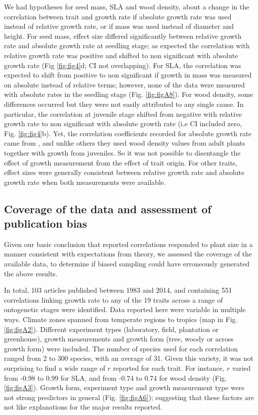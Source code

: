 \documentclass[a4paper,11pt]{article}
\begin{document}
We had hypotheses for seed mass, SLA and wood density, about a change in the correlation between trait and growth rate if absolute growth rate was used instead of relative growth rate, or if mass was used instead of diameter and height. For seed mass, effect size differed significantly between relative growth rate and absolute growth rate at seedling stage; as expected the correlation with relative growth rate was positive and shifted to non significant with absolute growth rate (Fig \ref{fig:fig4}d; CI not overlapping). For SLA, the correlation was expected to shift from positive to non significant if growth in mass was measured on absolute instead of relative terms; however, none of the data were measured with absolute rates in the seedling stage (Fig. \ref{fig:figA8}). For wood density, some differences occurred but they were not easily attributed to any single cause. In particular, the correlation at juvenile stage shifted from negative with relative growth rate to non significant with absolute growth rate (i.e CI included zero, Fig. \ref{fig:fig4}b). Yet, the correlation coefficients recorded for absolute growth rate came from \citet{Augspurger:1984ct}, and unlike others they used wood density values from adult plants together with growth from juveniles. So it was not possible to disentangle the effect of growth measurement from the effect of trait origin. For other traits, effect sizes were generally consistent between relative growth rate and absolute growth rate when both measurements were available.


\subsection*{Coverage of the data and assessment of publication bias}

Given our basic conclusion that reported correlations responded to plant size in a manner consistent with expectations from theory, we assessed the coverage of the available data, to determine if biased sampling could have erroneously generated the above results.

In total, 103 articles published between 1983 and 2014, and containing 551 correlations linking growth rate to any of the 19 traits across a range of ontogenetic stages were identified. Data reported here were variable in multiple ways. Climate zones spanned from temperate regions to tropics (map in Fig. \ref{fig:figA2}). Different experiment types (laboratory, field, plantation or greenhouse), growth measurements and growth form (tree, woody or across growth form) were included. The number of species used for each correlation ranged from 2 to 300 species, with an average of 31. Given this variety, it was not surprising to find a wide range of $r$ reported for each trait. For instance, $r$ varied from -0.98 to 0.99 for SLA, and from -0.74 to 0.74 for wood density (Fig. \ref{fig:figA3}). Growth form, experiment type and growth measurement type were not strong predictors in general (Fig. \ref{fig:figA6}); suggesting that these factors are not like explanations for the  major results reported.
\end{document}
